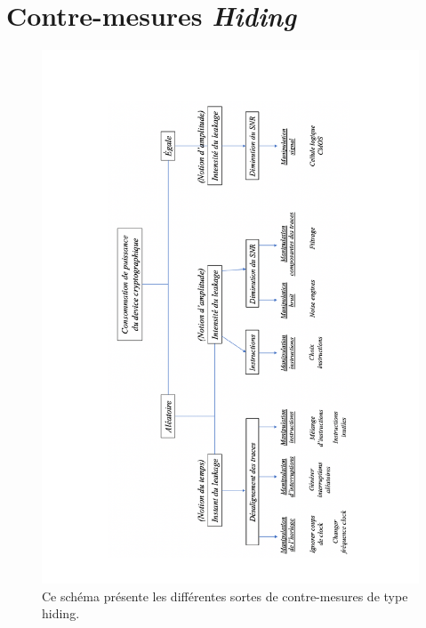 \documentclass[oneside]{book}
\begin{document}
\section{Contre-mesures \textit{Hiding}}
\label{ann:resume_hiding}
\begin{figure}[htb]
    \centering
    \includegraphics[width=1.2\linewidth, angle=90]{image/resume_hiding}
    \caption{Ce schéma présente les différentes sortes de contre-mesures de type hiding.}
    \label{fig:resume_hiding} 
\end{figure}

\newpage

\end{document}
